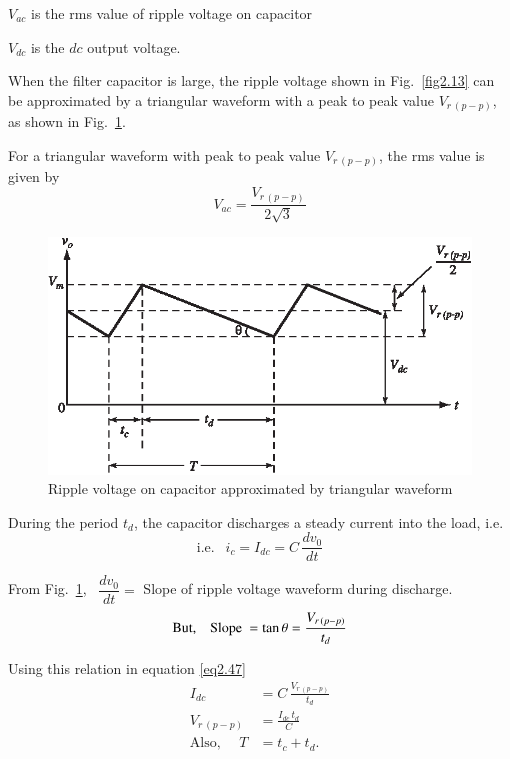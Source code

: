$V_{ac}$ is the rms value of ripple voltage on capacitor

$V_{dc}$ is the $dc$ output voltage.

When the filter capacitor is large, the ripple voltage shown in
Fig.~\ref{fig2.13} can be approximated by a triangular waveform with a peak to
peak value $V_{r\,(p-p)}$, as shown in Fig.~\ref{fig2.14}.

For a triangular waveform with peak to peak value $V_{r\,(p-p)}$, the
rms value is given by
\begin{equation}
V_{ac} = \frac{V_{r\,(p-p)}}{2 \sqrt{3}} \label{eq2.46}
\end{equation}
\begin{figure}[H]
\centering
\includegraphics{chap2/add-fig/S3-EE-02-014.eps}
\caption{Ripple voltage on capacitor approximated by triangular waveform}\label{fig2.14}
\end{figure}

During the period $t_d$, the capacitor discharges a steady current
into the load, i.e.
\begin{equation}
\text{i.e. } ~~ i_c = I_{dc} = C\, \frac{dv_0}{dt} \label{eq2.47}
\end{equation}

From Fig.~\ref{fig2.14}, \ $\dfrac{dv_0}{dt} =$ Slope of ripple voltage waveform
during discharge.
$$
\text{But,\quad Slope } = \tan \theta = \frac{V_{r\,(p-p)}}{t_d}
$$

Using this relation in equation \eqref{eq2.47}
\begin{align}
I_{dc} & = C\,\frac{V_{r\,(p-p)}}{t_d} \label{eq2.48}\\
V_{r\,(p-p)} & = \frac{I_{dc}\, t_d}{C} \label{eq2.49}\\
\text{Also, \ } \quad T & = t_c + t_d. \label{eq2.50} 
\end{align}

